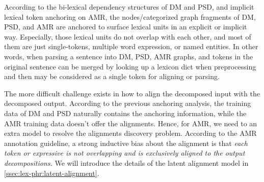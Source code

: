 According to the bi-lexical dependency structures of DM and PSD, and
implicit lexical token anchoring on AMR, the nodes/categorized graph
fragments of DM, PSD, and AMR are anchored to surface lexical units in
an explicit or implicit way. Especially, those lexical units do not
overlap with each other, and most of them are just single-tokens,
multiple word expression, or named entities. In other words, when
parsing a sentence into DM, PSD, AMR graphs, and tokens in the original
sentence can be merged by looking up a lexicon dict when preprocessing
and then may be considered as a single token for aligning or parsing.

The more difficult challenge exists in how to align the decomposed
input with the decomposed output. According to the previous anchoring
analysis, the training data of DM and PSD naturally contains the
anchoring information, while the AMR training data doesn't offer the
alignments. Hence, for AMR, we need to an extra model to resolve the
alignments discovery problem. According to the AMR annotation
guideline, a strong inductive bias about the alignment is that
\emph{each token or expressive is not overlapping and is
  exclusively aligned to the output decompositions.} We will
introduce the details of the latent alignment model in
\autoref{ssec:lex-phr:latent-alignment}.

